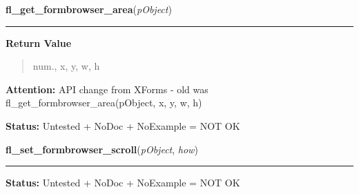 \hspace{.8\funcindent}\begin{boxedminipage}{\funcwidth}

    \raggedright \textbf{fl\_get\_formbrowser\_area}(\textit{pObject})

    \vspace{-1.5ex}

    \rule{\textwidth}{0.5\fboxrule}
\setlength{\parskip}{2ex}
\setlength{\parskip}{1ex}
      \textbf{Return Value}
    \vspace{-1ex}

      \begin{quote}
      num., x, y, w, h

      \end{quote}

\textbf{Attention:} API change from XForms - old was fl\_get\_formbrowser\_area(pObject, x, y, 
w, h)



\textbf{Status:} Untested + NoDoc + NoExample = NOT OK



    \end{boxedminipage}

    \label{xformslib:library:fl_set_formbrowser_scroll}

    \vspace{0.5ex}

\hspace{.8\funcindent}\begin{boxedminipage}{\funcwidth}

    \raggedright \textbf{fl\_set\_formbrowser\_scroll}(\textit{pObject}, \textit{how})

    \vspace{-1.5ex}

    \rule{\textwidth}{0.5\fboxrule}
\setlength{\parskip}{2ex}
\setlength{\parskip}{1ex}
\textbf{Status:} Untested + NoDoc + NoExample = NOT OK



    \end{boxedminipage}

    \label{xformslib:library:fl_set_formbrowser_hscrollbar}

    \vspace{0.5ex}

